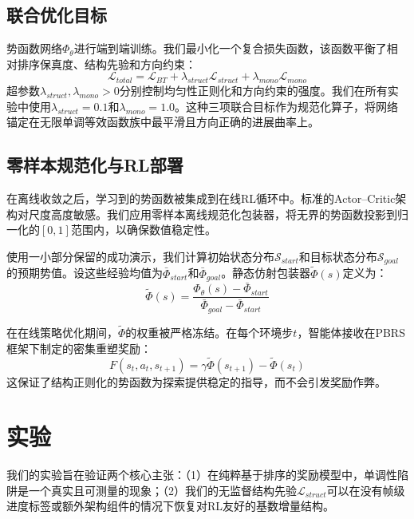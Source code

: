 \subsection{联合优化目标}

势函数网络$\Phi_\theta$进行端到端训练。我们最小化一个复合损失函数，该函数平衡了相对排序保真度、结构先验和方向约束：
\begin{equation}
\label{eq:total_loss}
    \mathcal{L}_{total} = \mathcal{L}_{BT} + \lambda_{struct} \mathcal{L}_{struct} + \lambda_{mono} \mathcal{L}_{mono}
\end{equation}
超参数$\lambda_{struct}, \lambda_{mono} > 0$分别控制均匀性正则化和方向约束的强度。我们在所有实验中使用$\lambda_{struct} = 0.1$和$\lambda_{mono} = 1.0$。这种三项联合目标作为规范化算子，将网络锚定在无限单调等效函数族中最平滑且方向正确的进展曲率上。

\subsection{零样本规范化与RL部署}

在离线收敛之后，学习到的势函数被集成到在线RL循环中。标准的Actor--Critic架构对尺度高度敏感。我们应用零样本离线规范化包装器，将无界的势函数投影到归一化的$[0, 1]$范围内，以确保数值稳定性。

使用一小部分保留的成功演示，我们计算初始状态分布$\mathcal{S}_{start}$和目标状态分布$\mathcal{S}_{goal}$的预期势值。设这些经验均值为$\bar{\Phi}_{start}$和$\bar{\Phi}_{goal}$。静态仿射包装器$\tilde{\Phi}(s)$定义为：
\begin{equation}
\label{eq:normalization}
    \tilde{\Phi}(s) = \frac{\Phi_\theta(s) - \bar{\Phi}_{start}}{\bar{\Phi}_{goal} - \bar{\Phi}_{start}}
\end{equation}

在在线策略优化期间，$\tilde{\Phi}$的权重被严格冻结。在每个环境步$t$，智能体接收在PBRS框架下制定的密集重塑奖励：
\begin{equation}
\label{eq:deploy}
    F(s_t, a_t, s_{t+1}) = \gamma \tilde{\Phi}(s_{t+1}) - \tilde{\Phi}(s_t)
\end{equation}
这保证了结构正则化的势函数为探索提供稳定的指导，而不会引发奖励作弊。



\clearpage
\section{实验}

我们的实验旨在验证两个核心主张：（1）在纯粹基于排序的奖励模型中，单调性陷阱是一个真实且可测量的现象；（2）我们的无监督结构先验$\mathcal{L}_{struct}$可以在没有帧级进度标签或额外架构组件的情况下恢复对RL友好的基数增量结构。

